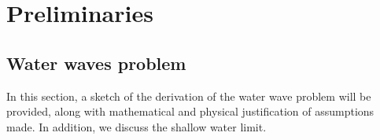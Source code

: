 
\chapter{Preliminaries} %

\label{Chapter2} %


\section{Water waves problem}
In this section, a sketch of the derivation of the water wave problem will be provided, along with mathematical and physical justification of assumptions made. In addition, we discuss the shallow water limit. 

